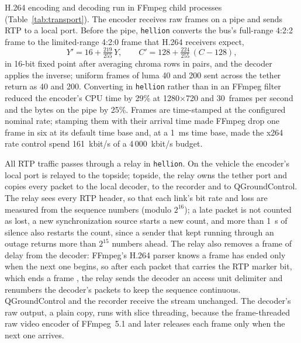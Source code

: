 \documentclass[a4paper,fleqn]{cas-sc}
\newcommand{\hellion}{\texttt{hellion}}
\begin{document}
H.264 encoding and decoding run in FFmpeg child processes \citep{ffmpeg}
(Table~\ref{tab:transport}). The encoder receives raw frames on a pipe and sends RTP
to a local port. Before the pipe, \hellion{} converts the bus's full-range 4:2:2 frame
to the limited-range 4:2:0 frame that H.264 receivers expect,
\begin{equation}\label{eq:range}
  Y' = 16 + \tfrac{219}{255}\,Y, \qquad C' = 128 + \tfrac{224}{255}\,(C - 128),
\end{equation}
in 16-bit fixed point after averaging chroma rows in pairs, and the decoder applies
the inverse; uniform frames of luma 40 and 200 sent across the tether return as 40 and
200. Converting in \hellion{} rather than in an FFmpeg filter reduced the encoder's
CPU time by 29\% at 1280$\times$720 and 30~frames per second and the bytes on the pipe
by 25\%. Frames are time-stamped at the configured nominal rate; stamping them with
their arrival time made FFmpeg drop one frame in six at its default time base and,
at a 1~ms time base, made the x264 rate control spend 161~kbit/s of a 4\,000~kbit/s
budget.

All RTP traffic passes through a relay in \hellion{}. On the vehicle the encoder's
local port is relayed to the topside; topside, the relay owns the tether port and
copies every packet to the local decoder, to the recorder and to QGroundControl. The
relay sees every RTP header, so that each link's bit rate and loss are measured from
the sequence numbers (modulo $2^{16}$); a late packet is not counted as lost, a new
synchronization source starts a new count, and more than 1~s of silence also restarts
the count, since a sender that kept running through an outage returns more than
$2^{15}$ numbers ahead. The relay also removes a frame of delay from the decoder:
FFmpeg's H.264 parser knows a frame has ended only when the next one begins, so
after each packet that carries the RTP marker bit, which ends a frame
\citep{rfc6184}, the relay sends the decoder an access unit delimiter and renumbers the
decoder's packets to keep the sequence continuous. QGroundControl and the recorder
receive the stream unchanged. The decoder's raw output, a plain copy, runs with slice
threading, because the frame-threaded raw video encoder of FFmpeg~5.1 and later
releases each frame only when the next one arrives.
\end{document}
